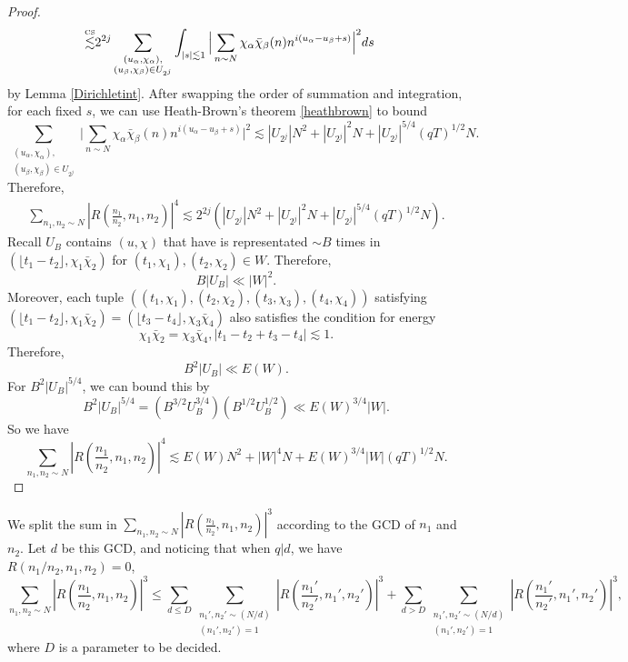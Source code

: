 \begin{proof}
\begin{align*}
 \stackon{CS}{\lesssim}& 2^{2j} \sum_{\substack{(u_{\alpha},\chi_{\alpha}),\\(u_{\beta},\chi_{\beta})\in U_{2^j}}} \int_{|s|\lesssim 1}\Big|\sum_{n\sim N}  \chi_\alpha\bar\chi_\beta(n){n}^{i(u_\alpha - u_\beta + s)}\Big|^2ds
\end{align*}
by Lemma \ref{Dirichletint}.
After swapping the order of summation and integration, for each fixed $s$, we can use Heath-Brown's theorem \ref{heathbrown} to bound \[
    \sum_{\substack{(u_{\alpha},\chi_{\alpha}),\\(u_{\beta},\chi_{\beta})\in U_{2^j}}}\Big|\sum_{n\sim N}  \chi_\alpha\bar\chi_\beta(n){n}^{i(u_\alpha - u_\beta + s)}\Big|^2
    \lesssim |U_{2^j}|N^2+ |U_{2^j}|^2N + |U_{2^j}|^{5/4}(qT)^{1/2}N.
\] 
Therefore, \begin{align*}
    \sum_{n_1,n_2\sim N} \left|R\left(\frac{n_1}{n_2} ,n_1,n_2\right) \right|^4 \lesssim 2^{2j}(|U_{2^j}|N^2+ |U_{2^j}|^2N + |U_{2^j}|^{5/4}(qT)^{1/2}N).
\end{align*}
Recall $U_B$ contains $(u,\chi)$ that have is representated $\sim B$ times in $(\lfloor t_1-t_2\rfloor, \chi_1\bar\chi_2)$ for $(t_1,\chi_1),(t_2,\chi_2)\in W$.
Therefore, \[
B|U_B|\ll |W|^2.
\] 
Moreover, each tuple $((t_1,\chi_1),(t_2,\chi_2),(t_3,\chi_3),(t_4,\chi_4))$ satisfying $(\lfloor t_1-t_2\rfloor, \chi_1\bar\chi_2)=(\lfloor t_3-t_4\rfloor, \chi_3\bar\chi_4)$ also satisfies the condition for energy \[
    \chi_1\bar\chi_2=\chi_3\bar\chi_4, |t_1-t_2+t_3-t_4|\lesssim 1.
\]
Therefore, \[
    B^2|U_B|\ll E(W).
\]
For $B^2|U_B|^{5/4}$, we can bound this by \[
B^2|U_B|^{5/4} = (B^{3/2}U_B^{3/4})(B^{1/2}U_B^{1/2})\ll E(W)^{3/4}|W|.
\]
So we have \[
    \sum_{n_1,n_2\sim N} \left|R\left(\frac{n_1}{n_2} ,n_1,n_2\right) \right|^4 \lesssim E(W)N^2+ |W|^4N +  E(W)^{3/4}|W|(qT)^{1/2}N.
\]

\end{proof}


We split the sum in $\sum_{n_1,n_2\sim N}  \left|R\left(\frac{n_1}{n_2} ,n_1,n_2\right) \right|^3$ according to the GCD of $n_1$ and $n_2$. Let $d$ be this GCD, and noticing that when $q|d$,  we have $R\left(n_1/n_2 ,n_1,n_2\right)=0$,\[
    \sum_{n_1,n_2\sim N}  \left|R\left(\frac{n_1}{n_2} ,n_1,n_2\right) \right|^3\leq \sum_{d\leq D}\sum_{\substack{n_1',n_2'\sim (N/d)\\(n_1',n_2')=1}}  \left|R\left(\frac{n_1'}{n_2'} ,n_1',n_2'\right) \right|^3+\sum_{d> D}\sum_{\substack{n_1',n_2'\sim (N/d)\\(n_1',n_2')=1}}  \left|R\left(\frac{n_1'}{n_2'} ,n_1',n_2'\right) \right|^3,
\]
where $D$ is a parameter to be decided.

